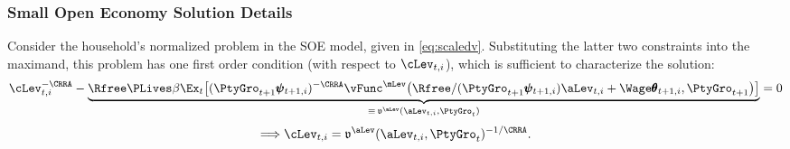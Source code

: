 
\subsubsection{Small Open Economy Solution Details}

Consider the household's normalized problem in the SOE model, given in \eqref{eq:scaledv}.  Substituting the latter two constraints into the maximand, this problem has one first order condition (with respect to $\cLev_{t,i}$), which is sufficient to characterize the solution:
\begin{equation}\label{eq:SOEFOC}
\cLev_{t,i}^{-\CRRA} - \underbrace{\Rfree \PLives \beta \Ex_t \big[  (\PtyGro_{t+1} \pmb{\psi}_{t+1,i})^{-\CRRA}\vFunc^\mLev\big(\Rfree/(\PtyGro_{t+1} \pmb{\psi}_{t+1,i}) \aLev_{t,i} + \Wage \pmb{\theta}_{t+1,i},\PtyGro_{t+1}\big) \big]}_{\equiv\,\mathfrak{v}^\aLev(\aLev_{t,i},\PtyGro_t)} = 0
\end{equation}
\begin{equation*}
\Longrightarrow \cLev_{t,i} = \mathfrak{v}^\aLev(\aLev_{t,i},\PtyGro_t)^{-1/\CRRA}.
\end{equation*}

